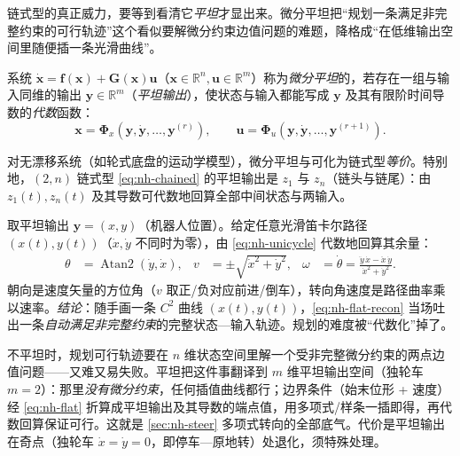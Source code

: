 链式型的真正威力，要等到看清它\emph{平坦}才显出来。微分平坦把“规划一条满足非完整约束的可行轨迹”这个看似要解微分约束边值问题的难题，降格成“在低维输出空间里随便插一条光滑曲线”。

\begin{definition}[微分平坦与平坦输出]\label{def:nh-flat}
系统 $\dot{\mathbf{x}}=\mathbf{f}(\mathbf{x})+\mathbf{G}(\mathbf{x})\mathbf{u}$（$\mathbf{x}\in\mathbb{R}^n,\mathbf{u}\in\mathbb{R}^m$）称为\emph{微分平坦}的，若存在一组与输入同维的输出 $\mathbf{y}\in\mathbb{R}^m$（\emph{平坦输出}），使状态与输入都能写成 $\mathbf{y}$ 及其有限阶时间导数的\emph{代数}函数：
\begin{equation}
  \mathbf{x}=\boldsymbol{\Phi}_x\!\left(\mathbf{y},\dot{\mathbf{y}},\dots,\mathbf{y}^{(r)}\right),
  \qquad
  \mathbf{u}=\boldsymbol{\Phi}_u\!\left(\mathbf{y},\dot{\mathbf{y}},\dots,\mathbf{y}^{(r+1)}\right).
  \label{eq:nh-flat}
\end{equation}
\end{definition}

\begin{theorem}\label{thm:nh-flat-chained}
对无漂移系统（如轮式底盘的运动学模型），微分平坦与可化为链式型\emph{等价}。特别地，$(2,n)$ 链式型 \cref{eq:nh-chained} 的平坦输出是 $z_1$ 与 $z_n$（链头与链尾）：由 $z_1(t),z_n(t)$ 及其导数可代数地回算全部中间状态与两输入。
\end{theorem}

\begin{example}[独轮车的笛卡尔坐标即平坦输出]\label{ex:nh-flat-unicycle}
取平坦输出 $\mathbf{y}=(x,y)$（机器人位置）。给定任意光滑笛卡尔路径 $(x(t),y(t))$（$\dot x,\dot y$ 不同时为零），由 \cref{eq:nh-unicycle} 代数地回算其余量：
\begin{align}
  \theta &= \operatorname{Atan2}(\dot y,\dot x),
  & v &= \pm\sqrt{\dot x^2+\dot y^2},
  & \omega &= \dot\theta=\frac{\ddot y\,\dot x-\ddot x\,\dot y}{\dot x^2+\dot y^2}.
  \label{eq:nh-flat-recon}
\end{align}
朝向是速度矢量的方位角（$v$ 取正/负对应前进/倒车），转向角速度是路径曲率乘以速率。\emph{结论}：随手画一条 $C^2$ 曲线 $(x(t),y(t))$，\cref{eq:nh-flat-recon} 当场吐出一条\emph{自动满足非完整约束}的完整状态—输入轨迹。规划的难度被“代数化”掉了。
\end{example}

\begin{insight}[平坦为何让规划“免费”]\label{ins:nh-flat-why}
不平坦时，规划可行轨迹要在 $n$ 维状态空间里解一个受非完整微分约束的两点边值问题——又难又易失败。平坦把这件事翻译到 $m$ 维平坦输出空间（独轮车 $m=2$）：那里\emph{没有微分约束}，任何插值曲线都行；边界条件（始末位形 + 速度）经 \cref{eq:nh-flat} 折算成平坦输出及其导数的端点值，用多项式/样条一插即得，再代数回算保证可行。这就是 \cref{sec:nh-steer} 多项式转向的全部底气。代价是平坦输出在奇点（独轮车 $\dot x=\dot y=0$，即停车—原地转）处退化，须特殊处理。
\end{insight}

